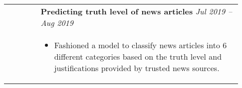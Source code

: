 \documentclass[letterpaper, 10pt, oneside]{article}
\newcommand{\bdit}[1]{{\textbf{#1}}}
\begin{document}
\begin{longtable}{@{} p{0.13\linewidth} p{0.8\linewidth}}
                                                      & \bdit{Predicting truth level of news articles} \hfill \textsl{Jul 2019 -- Aug 2019}                                                                                                                   \\
                                                      & \parbox{0.8\textwidth}{                                                                                                                                                                               %
        \begin{itemize}[leftmargin=*, itemsep=-0.88ex, topsep=0.2ex]
            \item Fashioned a model to classify news articles into 6 different categories based on the truth level and justifications provided by trusted news sources.
        \end{itemize}
    }                                                                                                                                                                                                                                                         \\
    \\[-1ex]




\end{longtable}
\end{document}

